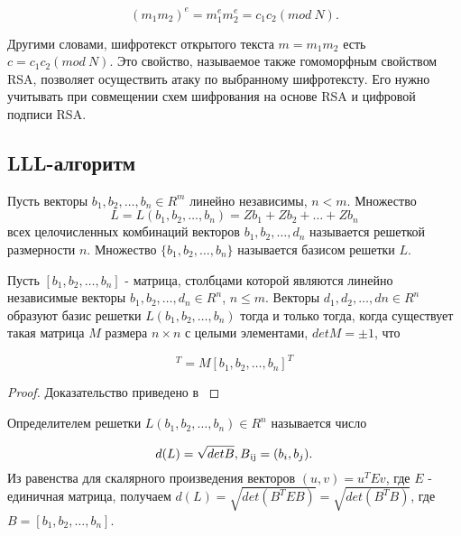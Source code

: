     \begin{equation}
      (m_1 m_2)^e = m_1^e m_2^e = c_1 c_2 (mod \: N).
    \end{equation}

  Другими словами, шифротекст открытого текста $m = m_1 m_2$ есть \\ $c = c_1 c_2 (mod \: N)$. Это свойство, называемое также гомоморфным 
  свойством  RSA, позволяет осуществить атаку по выбранному шифротексту. Его нужно учитывать при совмещении схем шифрования на основе RSA и цифровой подписи
  RSA.

\subsection{LLL-алгоритм}

  \begin{definition}
    Пусть векторы $ b_1, b_2, \dots, b_n \in R^m$ линейно независимы, $n < m$. Множество 
      \begin{equation}
	       L=L(b_1, b_2, \dots, b_n) = Zb_1 + Zb_2 + \dots + Zb_n
      \end{equation}    
    всех целочисленных комбинаций векторов $ b_1, b_2, \dots, d_n$ называется решеткой размерности $n$. Множество
    $ \{b_1, b_2, \dots, b_n \} $ называется базисом решетки $L$.
  \end{definition}
  
  \begin{theorem}
    Пусть {$[b_1, b_2, \dots, b_n]$} - матрица, столбцами которой являются линейно независимые векторы {$ b_1, b_2, \dots, d_n \in R^n$}, {$n \le m$}.
    Векторы $ d_1, d_2, \dots, dn \in R^n$ образуют базис решетки {$L(b_1, b_2, \dots, b_n)$} тогда и только тогда, когда существует такая матрица
    {$M$} размера {$n \times n$} с целыми элементами, {$detM = \pm 1$}, что
    
      \begin{equation}
        [d_1, d_2, \dots, d_n]^T = M [b_1, b_2, \dots, b_n]^T
      \end{equation}

      \begin{proof}
        Доказательство приведено в \cite[Глава 8.2, страница 260]{mah06}
      \end{proof}
  \end{theorem}  

  \begin{definition}
   Определителем решетки {$L(b_1,b_2, \dots, b_n) \in R^n$} называется число
   
   \begin{equation}
    d(L) = \sqrt{detB}, B\textsubscript{ij} = (b_i, b_j).
   \end{equation}
   Из равенства для скалярного произведения векторов {$(u, v) = u^T E v$}, где $E$ - единичная матрица, получаем 
   $d(L) = \sqrt{det(B^TEB)} = \sqrt{det(B^TB)}$, где {$B = [b_1,b_2, \dots, b_n]$}.
  \end{definition}
  
